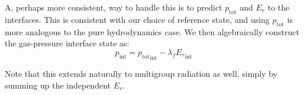 \documentclass[12pt]{article}
\begin{document}
A, perhaps more consistent, way to handle this is to predict $p_\mathrm{tot}$
and $E_r$ to the interfaces.  This is consistent with our choice of
reference state, and using $p_\mathrm{tot}$ is more analogous to the
pure hydrodynamics case.  We then algebraically construct the
gas-pressure interface state as:
\begin{equation}
p_\mathrm{int} = {p_\mathrm{tot}}_\mathrm{int} - \lambda_f {E_r}_\mathrm{int}
\end{equation}

Note that this extends naturally to multigroup radiation as well, simply by
summing up the independent $E_r$.
\end{document}
